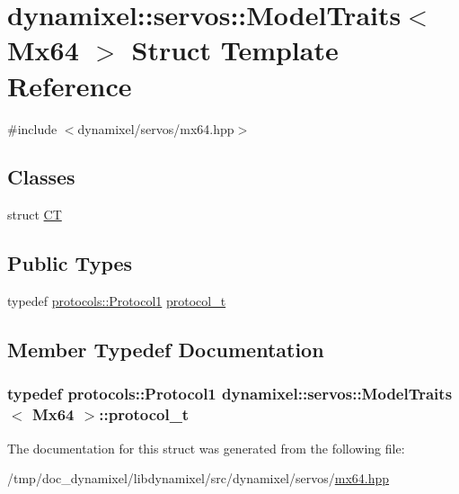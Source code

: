 \hypertarget{structdynamixel_1_1servos_1_1_model_traits_3_01_mx64_01_4}{}\section{dynamixel\+:\+:servos\+:\+:Model\+Traits$<$ Mx64 $>$ Struct Template Reference}
\label{structdynamixel_1_1servos_1_1_model_traits_3_01_mx64_01_4}


{\ttfamily \#include $<$dynamixel/servos/mx64.\+hpp$>$}

\subsection*{Classes}
\begin{DoxyCompactItemize}
\item 
struct \hyperlink{structdynamixel_1_1servos_1_1_model_traits_3_01_mx64_01_4_1_1_c_t}{C\+T}
\end{DoxyCompactItemize}
\subsection*{Public Types}
\begin{DoxyCompactItemize}
\item 
typedef \hyperlink{classdynamixel_1_1protocols_1_1_protocol1}{protocols\+::\+Protocol1} \hyperlink{structdynamixel_1_1servos_1_1_model_traits_3_01_mx64_01_4_ae6ab4138280d3f41efbcab9a01d345cc}{protocol\+\_\+t}
\end{DoxyCompactItemize}


\subsection{Member Typedef Documentation}
\hypertarget{structdynamixel_1_1servos_1_1_model_traits_3_01_mx64_01_4_ae6ab4138280d3f41efbcab9a01d345cc}{}
\subsubsection[{protocol\+\_\+t}]{\setlength{\rightskip}{0pt plus 5cm}typedef {\bf protocols\+::\+Protocol1} {\bf dynamixel\+::servos\+::\+Model\+Traits}$<$ {\bf Mx64} $>$\+::{\bf protocol\+\_\+t}}\label{structdynamixel_1_1servos_1_1_model_traits_3_01_mx64_01_4_ae6ab4138280d3f41efbcab9a01d345cc}


The documentation for this struct was generated from the following file\+:\begin{DoxyCompactItemize}
\item 
/tmp/doc\+\_\+dynamixel/libdynamixel/src/dynamixel/servos/\hyperlink{mx64_8hpp}{mx64.\+hpp}\end{DoxyCompactItemize}
